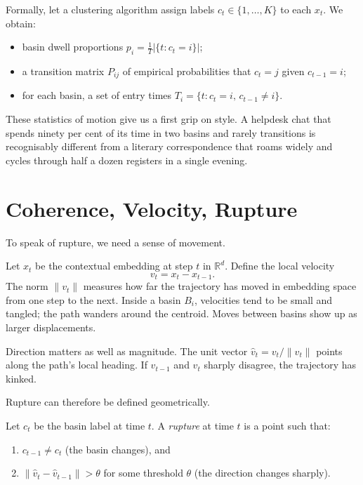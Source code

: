 \documentclass[12pt,a4paper]{article}
\begin{document}
Formally, let a clustering algorithm assign labels $c_t \in \{1, \ldots, K\}$ to each $x_t$.
We obtain:

\begin{itemize}
  \item basin dwell proportions $p_i = \frac{1}{T} |\{t : c_t = i\}|$;
  \item a transition matrix $P_{ij}$ of empirical probabilities that $c_t = j$ given $c_{t-1} = i$;
  \item for each basin, a set of entry times $T_i = \{t : c_t = i,\, c_{t-1} \neq i\}$.
\end{itemize}

These statistics of motion give us a first grip on style. A helpdesk chat that spends ninety per cent of its time in two basins and rarely transitions is recognisably different from a literary correspondence that roams widely and cycles through half a dozen registers in a single evening.


\section{Coherence, Velocity, Rupture}

To speak of rupture, we need a sense of movement.

Let $x_t$ be the contextual embedding at step $t$ in $\mathbb{R}^d$. Define the local velocity
\[
v_t = x_t - x_{t-1}.
\]
The norm $\|v_t\|$ measures how far the trajectory has moved in embedding space from one step to the next. Inside a basin $B_i$, velocities tend to be small and tangled; the path wanders around the centroid. Moves between basins show up as larger displacements.

Direction matters as well as magnitude. The unit vector $\hat{v}_t = v_t / \|v_t\|$ points along the path's local heading. If $\hat{v}_{t-1}$ and $\hat{v}_t$ sharply disagree, the trajectory has kinked.

Rupture can therefore be defined geometrically.

\begin{formalbox}[title={Rupture as Kink and Crossing}]
Let $c_t$ be the basin label at time $t$. A \emph{rupture} at time $t$ is a point such that:
\begin{enumerate}
  \item $c_{t-1} \neq c_t$ (the basin changes), and
  \item $\|\hat{v}_t - \hat{v}_{t-1}\| > \theta$ for some threshold $\theta$ (the direction changes sharply).
\end{enumerate}
\end{formalbox}
\end{document}
